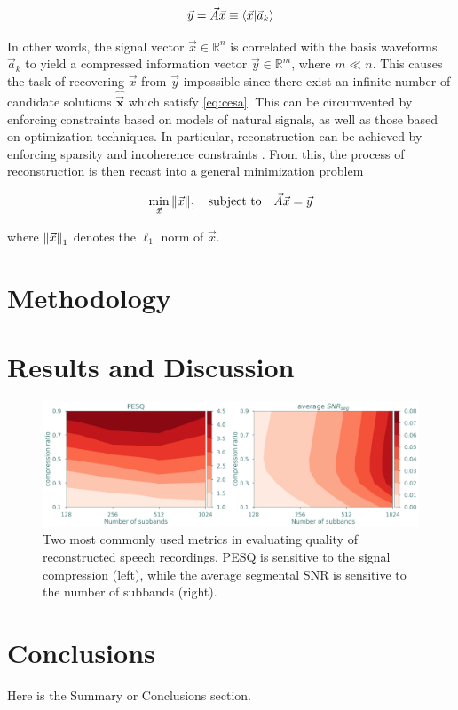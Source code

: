 \documentclass[10pt,a4paper,twoside]{article}
\begin{document}
\begin{equation}\label{eq:cesa}
	\vec{y} = \vec{A}\vec{x} \equiv \innerproduct{\vec{x}}{\vec{a}_k}
\end{equation}

In other words, the signal vector $\vec{x} \in \mathbb{R}^n$ is correlated with the basis waveforms $\vec{a}_k$ to yield a compressed information vector $\vec{y} \in \mathbb{R}^m$, where $m \ll n$. This causes the task of recovering $\vec{x}$ from $\vec{y}$ impossible since there exist an infinite number of candidate solutions $\bm\hat{\vec{x}}$ which satisfy \eqref{eq:cesa}. This can be circumvented by enforcing constraints based on models of natural signals, as well as those based on optimization techniques. In particular, reconstruction can be achieved by enforcing sparsity and incoherence constraints \cite{Candes2008b}. From this, the process of reconstruction is then recast into a general minimization problem

\begin{equation}\label{eq:minl1}
	\min_{\vec{x}} \norm{\vec{x}}_1 \quad \textrm{subject to} \quad \vec{A}\vec{x} = \vec{y}
\end{equation}

\noindent where $\norm{\vec{x}}_1$ denotes the $\ell_1$ norm of $\vec{x}$.


\section{Methodology}

\section{Results and Discussion}

\begin{figure}[tb]
	\centering
	\includegraphics[width=\textwidth]{clean-pesq-snr.png}
	\caption{Two most commonly used metrics in evaluating quality of reconstructed speech recordings. PESQ is sensitive to the signal compression (left), while the average segmental SNR is sensitive to the number of subbands (right).}
	\label{fig:pesq-snr}
\end{figure}


\section{Conclusions}
Here is the Summary or Conclusions section.




\end{document}
